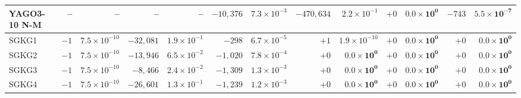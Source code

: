 \begin{tabular}{lrrrr|rrrr|rrrr}
YAGO3-10 N-M & – & – & – & – & $-10{,}376$ & $7.3\times10^{-3}$ & $-470{,}634$ & $2.2\times10^{-1}$ & $+0$ & $\mathbf{0.0\times10^{0}}$ & $-743$ & $\mathbf{5.5\times10^{-7}}$ \\
\midrule
SGKG1 & $-1$ & $7.5\times10^{-10}$ & $-32{,}081$ & $1.9\times10^{-1}$ & $-298$ & $6.7\times10^{-5}$ & $+1$ & $1.9\times10^{-10}$ & $+0$ & $\mathbf{0.0\times10^{0}}$ & $+0$ & $\mathbf{0.0\times10^{0}}$ \\
SGKG2 & $-1$ & $7.5\times10^{-10}$ & $-13{,}946$ & $6.5\times10^{-2}$ & $-1{,}020$ & $7.8\times10^{-4}$ & $+0$ & $\mathbf{0.0\times10^{0}}$ & $+0$ & $\mathbf{0.0\times10^{0}}$ & $+0$ & $\mathbf{0.0\times10^{0}}$ \\
SGKG3 & $-1$ & $7.5\times10^{-10}$ & $-8{,}466$ & $2.4\times10^{-2}$ & $-1{,}309$ & $1.3\times10^{-3}$ & $+0$ & $\mathbf{0.0\times10^{0}}$ & $+0$ & $\mathbf{0.0\times10^{0}}$ & $+0$ & $\mathbf{0.0\times10^{0}}$ \\
SGKG4 & $-1$ & $7.5\times10^{-10}$ & $-26{,}601$ & $1.3\times10^{-1}$ & $-1{,}239$ & $1.2\times10^{-3}$ & $+0$ & $\mathbf{0.0\times10^{0}}$ & $+0$ & $\mathbf{0.0\times10^{0}}$ & $+0$ & $\mathbf{0.0\times10^{0}}$ \\
\bottomrule
\end{tabular}

